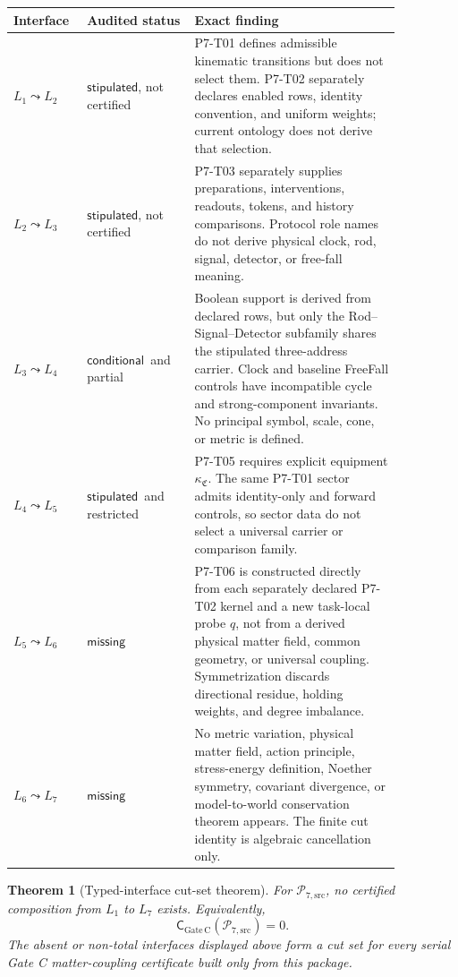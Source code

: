 \documentclass[11pt]{article}
\newtheorem{theorem}{Theorem}
\newcommand{\Src}{\mathrm{src}}
\newcommand{\Pkg}{\mathcal P_{7,\Src}}
\newcommand{\Cert}{\mathsf C_{\mathrm{Gate\,C}}}
\newcommand{\Missing}{\ensuremath{\mathsf{missing}}}
\newcommand{\Conditional}{\ensuremath{\mathsf{conditional}}}
\newcommand{\Stipulated}{\ensuremath{\mathsf{stipulated}}}
\begin{document}
\begin{longtable}{p{0.13\linewidth}p{0.25\linewidth}p{0.48\linewidth}}
\toprule
Interface & Audited status & Exact finding\\
\midrule
\endhead
\(L_1\leadsto L_2\) &
\Stipulated, not certified &
P7-T01 defines admissible kinematic transitions but does not select them.
P7-T02 separately declares enabled rows, identity convention, and uniform
weights; current ontology does not derive that selection.\\
\(L_2\leadsto L_3\) &
\Stipulated, not certified &
P7-T03 separately supplies preparations, interventions, readouts, tokens,
and history comparisons. Protocol role names do not derive physical clock,
rod, signal, detector, or free-fall meaning.\\
\(L_3\leadsto L_4\) &
\Conditional\ and partial &
Boolean support is derived from declared rows, but only the
Rod--Signal--Detector subfamily shares the stipulated three-address carrier.
Clock and baseline FreeFall controls have incompatible cycle and
strong-component invariants. No principal symbol, scale, cone, or metric is
defined.\\
\(L_4\leadsto L_5\) &
\Stipulated\ and restricted &
P7-T05 requires explicit equipment \(\kappa_{\mathfrak C}\). The same P7-T01
sector admits identity-only and forward controls, so sector data do not select
a universal carrier or comparison family.\\
\(L_5\leadsto L_6\) &
\Missing &
P7-T06 is constructed directly from each separately declared P7-T02 kernel
and a new task-local probe \(q\), not from a derived physical matter field,
common geometry, or universal coupling. Symmetrization discards directional
residue, holding weights, and degree imbalance.\\
\(L_6\leadsto L_7\) &
\Missing &
No metric variation, physical matter field, action principle, stress-energy
definition, Noether symmetry, covariant divergence, or model-to-world
conservation theorem appears. The finite cut identity is algebraic
cancellation only.\\
\bottomrule
\end{longtable}

\begin{theorem}[Typed-interface cut-set theorem]
\label{thm:cutset}
For \(\Pkg\), no certified composition from \(L_1\) to \(L_7\) exists.
Equivalently,
\[
 \Cert(\Pkg)=0.
\]
The absent or non-total interfaces displayed above form a cut set for every
serial Gate C matter-coupling certificate built only from this package.
\end{theorem}
\end{document}
